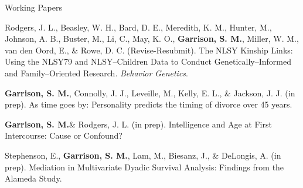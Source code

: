 \documentclass {resume}
\newlength{\wideitemsep}
\let\olditem\item
\renewcommand{\item}{\setlength{\itemsep}{\wideitemsep}\olditem}
\newcommand{\meb}{{\bf Garrison, S. M.}\xspace}
\begin{document}
\begin{comment}
\begin{itemize}

\end{itemize}
\end{comment}
\begin{rSection}{\textrm{Working Papers}}
\begin{etaremune}
\item Rodgers, J. L., Beasley, W. H., Bard, D. E., Meredith, K. M., Hunter, M., Johnson, A. B., Buster, M., Li, C., May, K. O., \meb, Miller, W. M., van den Oord, E., \& Rowe, D. C. (Revise-Resubmit). The NLSY Kinship Links: Using the NLSY79 and NLSY--Children Data to Conduct Genetically--Informed and Family--Oriented Research. \textit{Behavior Genetics}.
\item\meb, Connolly, J. J., Leveille, M., Kelly, E. L., \& Jackson, J. J. (in prep). As time goes by: Personality predicts the timing of divorce over 45 years. %
\item\meb \& Rodgers, J. L. (in prep). Intelligence and Age at First Intercourse: Cause or Confound?%
\item Stephenson, E., \meb, Lam, M., Biesanz, J., \& DeLongis, A. (in prep). Mediation in Multivariate Dyadic Survival Analysis: Findings from the Alameda Study.
\end{etaremune}
\end{rSection}

\end{document}
